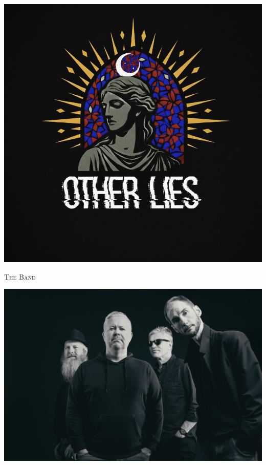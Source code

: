 \begin{titlepage}
  \thispagestyle{empty}
  \setcounter{page}{0}

  \pagecolor{logobg}
  \color{white}

  \maketitle

  \vspace{2cm}

  \centering
  \includegraphics[height=0.5\textheight]{Other-Lies-Logo.png}\\

  \newpage

  \pagecolor{bandbg}
  \color{white}

  \vspace{5em}

  \begin{center}
    {\Huge \sffamily \scshape The Band}\\
  \end{center}

  \centering
  \includegraphics[width=0.9\linewidth]{Other-Lies-Band.jpeg}


\end{titlepage}
